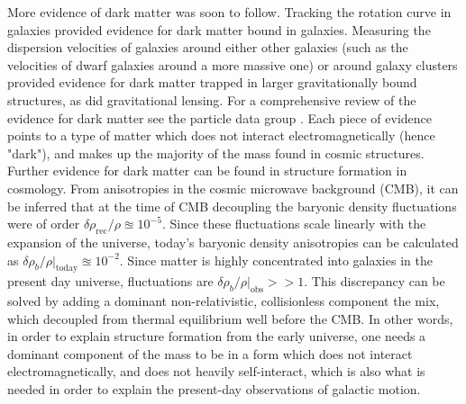 More evidence of dark matter was soon to follow. Tracking the rotation curve in galaxies provided evidence for dark matter bound in galaxies\cite{Sofue2020, Sofue_2016, history_of_dark_matter}. Measuring the dispersion velocities of galaxies around either other galaxies (such as the velocities of dwarf galaxies around a more massive one) or around galaxy clusters provided evidence for dark matter trapped in larger gravitationally bound structures, as did gravitational lensing\cite{Cluster_lenses}. For a comprehensive review of the evidence for dark matter see the particle data group \cite{PDG2022}. Each piece of evidence points to a type of matter which does not interact electromagnetically (hence "dark"), and makes up the majority of the mass found in cosmic structures. \\

Further evidence for dark matter can be found in structure formation in cosmology. From anisotropies in the cosmic microwave background (CMB), it can be inferred that at the time of CMB decoupling the baryonic density fluctuations were of order $\delta\rho_\mathrm{rec} / \rho \approxeq 10^{-5}$. Since these fluctuations scale linearly with the expansion of the universe, today's baryonic density anisotropies can be calculated as $\delta\rho_b / \rho |_\mathrm{today}\approxeq 10^{-2}$\cite{PDG2022}. Since matter is highly concentrated into galaxies in the present day universe, fluctuations are $\delta\rho_b / \rho |_\mathrm{obs}>> 1$. This discrepancy can be solved by adding a dominant non-relativistic, collisionless component the mix, which decoupled from thermal equilibrium well before the CMB. In other words, in order to explain structure formation from the early universe, one needs a dominant component of the mass to be in a form which does not interact electromagnetically, and does not heavily self-interact, which is also what is needed in order to explain the present-day observations of galactic motion. \\

